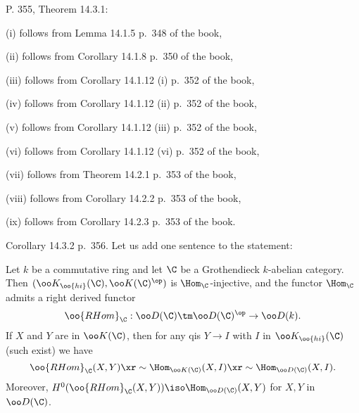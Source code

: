\documentclass[12pt]{article}
\theoremstyle{remark}
\theoremstyle{definition}
\begin{document}
%

\begin{s}
P. 355, Theorem 14.3.1: 

(i) follows from Lemma 14.1.5 p.~348 of the book, 

(ii) follows from Corollary 14.1.8 p.~350 of the book, 

(iii) follows from Corollary 14.1.12 (i) p.~352 of the book, 

(iv) follows from Corollary 14.1.12 (ii) p.~352 of the book, 

(v) follows from Corollary 14.1.12 (iii) p.~352 of the book, 

(vi) follows from Corollary 14.1.12 (vi) p.~352 of the book,  

(vii) follows from Theorem 14.2.1 p.~353 of the book, 

(viii) follows from Corollary 14.2.2 p.~353 of the book, 

(ix) follows from Corollary 14.2.3 p.~353 of the book.
\end{s}

%

\begin{s}
Corollary 14.3.2 p.~356. Let us add one sentence to the statement:
%
\begin{cor}
Let $k$ be a commutative ring and let $\C$ be a Grothendieck $k$-abelian category. Then $(\oo K_{\oo{hi}}(\C),\oo K(\C)^{\op})$ is $\Hom_\C$-injective, and the functor $\Hom_\C$ admits a right derived functor 
$$
\oo{RHom}_\C:\oo D(\C)\tm\oo D(\C)^{\op}\to\oo D(k).
$$ 
If $X$ and $Y$ are in $\oo K(\C)$, then for any qis $Y\to I$ with $I$ in $\oo K_{\oo{hi}}(\C)$ (such exist) we have 
$$
\oo{RHom}_\C(X,Y)\xr\sim\Hom_{\oo K(\C)}(X,I)\xr\sim\Hom_{\oo D(\C)}(X,I).
$$ 
Moreover, $H^0(\oo{RHom}_\C(X,Y))\iso\Hom_{\oo D(\C)}(X,Y)$ for $X,Y$ in $\oo D(\C)$.
\end{cor}
\end{s}

\end{document}
